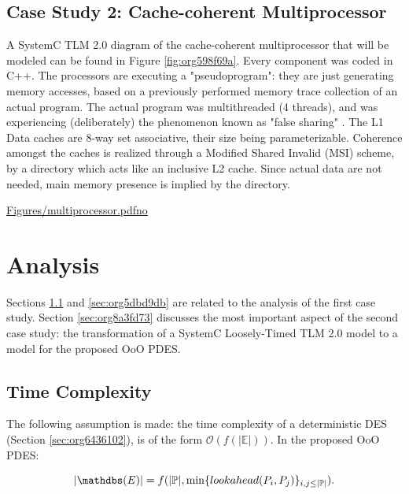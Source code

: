 \documentclass[11pt]{article}
\begin{document}
\clearpage

\subsection{Case Study 2: Cache-coherent Multiprocessor}
\label{sec:org7189b0e}
A SystemC TLM 2.0 diagram of the cache-coherent multiprocessor that will be modeled can be found in Figure \ref{fig:org598f69a}.
Every component was coded in C++.
The processors are executing a "pseudoprogram": they are just generating memory accesses, based on a previously performed memory trace collection of an actual program.
The actual program was multithreaded (4 threads), and was experiencing (deliberately) the phenomenon known as "false sharing" \cite{Hennessy2011}.
The L1 Data caches are 8-way set associative, their size being parameterizable.
Coherence amongst the caches is realized through a Modified Shared Invalid (MSI) scheme, by a directory which acts like an inclusive L2 cache.
Since actual data are not needed, main memory presence is implied by the directory.

\url{Figures/multiprocessor.pdfno}







\clearpage

\section{Analysis}
\label{sec:org1cdc1b0}
Sections \ref{sec:orgbb0cec4} and \ref{sec:org5dbd9db} are related to the analysis of the first case study.
Section \ref{sec:org8a3fd73} discusses the most important aspect of the second case study: the transformation of a SystemC Loosely-Timed TLM 2.0 model to a model for the proposed OoO PDES.

\subsection{Time Complexity}
\label{sec:orgbb0cec4}
The following assumption is made: the time complexity of a deterministic DES (Section \ref{sec:org6436102}), is of the form \(\mathcal{O}(f(|\mathds{E}|))\).
In the proposed OoO PDES:

\begin{LATEX}
\begin{equation} 
   |\mathdbs(E)| = f(|\mathbb{P}|, \min\{lookahead(P_i,P_j)\}_{i,j \leq |\mathbb{P}|}).
\end{equation}
\end{LATEX}
\end{document}
